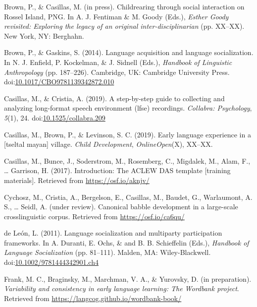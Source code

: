 \documentclass[,man,floatsintext]{apa6}
\begin{document}
\hypertarget{ref-brownIPchildrearing}{}
Brown, P., \& Casillas, M. (in press). Childrearing through social
interaction on Rossel Island, PNG. In A. J. Fentiman \& M. Goody (Eds.),
\emph{Esther Goody revisited: Exploring the legacy of an original
inter-disciplinarian} (pp. XX--XX). New York, NY: Berghahn.

\hypertarget{ref-brown2014language}{}
Brown, P., \& Gaskins, S. (2014). Language acquisition and language
socialization. In N. J. Enfield, P. Kockelman, \& J. Sidnell (Eds.),
\emph{Handbook of Linguistic Anthropology} (pp. 187--226). Cambridge,
UK: Cambridge University Press.
doi:\href{https://doi.org/10.1017/CBO9781139342872.010}{10.1017/CBO9781139342872.010}

\hypertarget{ref-casillas2019stepbystep}{}
Casillas, M., \& Cristia, A. (2019). A step-by-step guide to collecting
and analyzing long-format speech environment (lfse) recordings.
\emph{Collabra: Psychology}, \emph{5}(1), 24.
doi:\href{https://doi.org/10.1525/collabra.209}{10.1525/collabra.209}

\hypertarget{ref-casillas2019early}{}
Casillas, M., Brown, P., \& Levinson, S. C. (2019). Early language
experience in a {[}tseltal mayan{]} village. \emph{Child Development},
\emph{OnlineOpen}(X), XX--XX.

\hypertarget{ref-casillas2017ACLEWDAS}{}
Casillas, M., Bunce, J., Soderstrom, M., Rosemberg, C., Migdalek, M.,
Alam, F., \ldots{} Garrison, H. (2017). Introduction: The ACLEW DAS
template {[}training materials{]}. Retrieved from
\url{https://osf.io/aknjv/}

\hypertarget{ref-cychoszURcanonical}{}
Cychosz, M., Cristia, A., Bergelson, E., Casillas, M., Baudet, G.,
Warlaumont, A. S., \ldots{} Seidl, A. (under review). Canonical babble
development in a large-scale crosslinguistic corpus. Retrieved from
\url{https://osf.io/ca6qu/}

\hypertarget{ref-deleon2011language}{}
de León, L. (2011). Language socialization and multiparty participation
frameworks. In A. Duranti, E. Ochs, \& and B. B. Schieffelin (Eds.),
\emph{Handbook of Language Socialization} (pp. 81--111). Malden, MA:
Wiley-Blackwell.
doi:\href{https://doi.org/10.1002/9781444342901.ch4}{10.1002/9781444342901.ch4}

\hypertarget{ref-frankIPvariability}{}
Frank, M. C., Braginsky, M., Marchman, V. A., \& Yurovsky, D. (in
preparation). \emph{Variability and consistency in early language
learning: The Wordbank project}. Retrieved from
\url{https://langcog.github.io/wordbank-book/}
\end{document}
